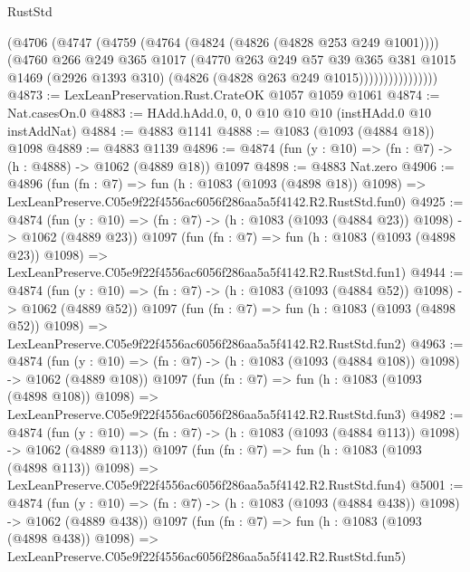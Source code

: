 \begin{lexlean}{RustStd}
\begin{coremodule}
                      (@4706
                        (@4747
                          (@4759
                            (@4764 (@4824 (@4826 (@4828 @253 @249 @1001))))
                            (@4760
                              @266
                              @249
                              @365
                              @1017
                              (@4770
                                @263
                                @249
                                @57
                                @39
                                @365
                                @381
                                @1015
                                @1469
                                (@2926 @1393 @310)
                                (@4826 (@4828 @263 @249 @1015))))))))))))))))
@4873 := LexLeanPreservation.Rust.CrateOK @1057 @1059 @1061
@4874 := Nat.casesOn.{0}
@4883 := HAdd.hAdd.{0, 0, 0} @10 @10 @10 (instHAdd.{0} @10 instAddNat)
@4884 := @4883 @1141
@4888 := @1083 (@1093 (@4884 @18)) @1098
@4889 := @4883 @1139
@4896 := @4874 (fun (y : @10) => (fn : @7) -> (h : @4888) -> @1062 (@4889 @18)) @1097
@4898 := @4883 Nat.zero
@4906 := @4896
    (fun (fn : @7) =>
    fun (h : @1083 (@1093 (@4898 @18)) @1098) =>
    LexLeanPreserve.C05e9f22f4556ac6056f286aa5a5f4142.R2.RustStd.fun0)
@4925 := @4874
    (fun (y : @10) => (fn : @7) -> (h : @1083 (@1093 (@4884 @23)) @1098) -> @1062 (@4889 @23))
    @1097
    (fun (fn : @7) =>
    fun (h : @1083 (@1093 (@4898 @23)) @1098) =>
    LexLeanPreserve.C05e9f22f4556ac6056f286aa5a5f4142.R2.RustStd.fun1)
@4944 := @4874
    (fun (y : @10) => (fn : @7) -> (h : @1083 (@1093 (@4884 @52)) @1098) -> @1062 (@4889 @52))
    @1097
    (fun (fn : @7) =>
    fun (h : @1083 (@1093 (@4898 @52)) @1098) =>
    LexLeanPreserve.C05e9f22f4556ac6056f286aa5a5f4142.R2.RustStd.fun2)
@4963 := @4874
    (fun (y : @10) => (fn : @7) -> (h : @1083 (@1093 (@4884 @108)) @1098) -> @1062 (@4889 @108))
    @1097
    (fun (fn : @7) =>
    fun (h : @1083 (@1093 (@4898 @108)) @1098) =>
    LexLeanPreserve.C05e9f22f4556ac6056f286aa5a5f4142.R2.RustStd.fun3)
@4982 := @4874
    (fun (y : @10) => (fn : @7) -> (h : @1083 (@1093 (@4884 @113)) @1098) -> @1062 (@4889 @113))
    @1097
    (fun (fn : @7) =>
    fun (h : @1083 (@1093 (@4898 @113)) @1098) =>
    LexLeanPreserve.C05e9f22f4556ac6056f286aa5a5f4142.R2.RustStd.fun4)
@5001 := @4874
    (fun (y : @10) => (fn : @7) -> (h : @1083 (@1093 (@4884 @438)) @1098) -> @1062 (@4889 @438))
    @1097
    (fun (fn : @7) =>
    fun (h : @1083 (@1093 (@4898 @438)) @1098) =>
    LexLeanPreserve.C05e9f22f4556ac6056f286aa5a5f4142.R2.RustStd.fun5)

\end{coremodule}
\end{lexlean}
